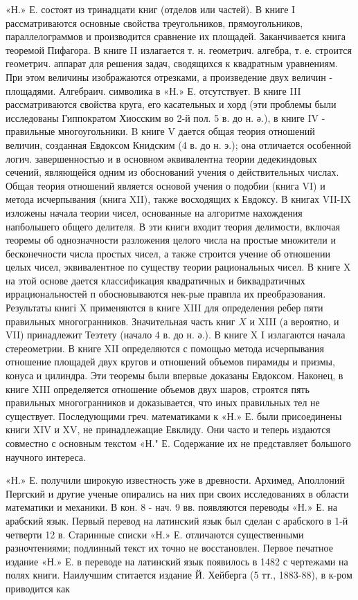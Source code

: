 \documentclass[10pt]{article}
\begin{document}
«Н.» Е. состоят из тринадцати книг (отделов или частей). В книге I рассматриваются основные свойства треугольников, прямоугольников, параллелограммов и производится сравнение их площадей. Заканчивается книга теоремой Пифагора. В книге II излагается т. н. геометрич. алгебра, т. е. строится геометрич. аппарат для решения задач, сводящихся к квадратным уравнениям. При этом величины изображаются отрезками, а произведение двух величин - площадями. Алгебраич. символика в «Н.» Е. отсутствует. В книге III рассматриваются свойства круга, его касательных и хорд (эти проблемы были исследованы Гиппократом Хиосским во 2-й пол. 5 в. до н. ә.), в книге IV - правильные многоугольники. B книге $\mathrm{V}$ дается общая теория отношений величин, созданная Евдоксом Книдским (4 в. до н. э.); она отличается особенной логич. завершенностью и в основном әквивалентна теории дедекиндовых сечений, являющейся одним из обоснований учения о действительных числах. Общая теория отношений является основой учения о подобии (книга VI) и метода исчерпывания (книга XII), также восходящих к Евдоксу. В книгах VII-IX изложены начала теории чисел, основанные на алгоритме нахождения напбольшего общего делителя. В эти книги входит теория делимости, включая теоремы об однозначности разложения целого числа на простые множители и бесконечности числа простых чисел, а также строится учение об отношении целых чисел, эквивалентное по существу теории рациональных чисел. В книге $\mathrm{X}$ на этой основе дается классификация квадратичных и биквадратичных иррациональностей п обосновываются нек-рые правпла их преобразования. Результаты книгі $\mathrm{X}$ применяются в книге XIII для определения ребер пяти правильных многогранников. Значительная часть книг $X$ и XIII (а вероятно, и VII) принадлежит Теэтету (начало 4 в. до н. ә.). В книге X I излагаются начала стереометрии. В книге XII определяются с помощью метода исчерпывания отношение площадей двух кругов и отношений объемов пирамиды и призмы, конуса и цилиндра. Эти теоремы были впервые доказаны Евдоксом. Наконец, в книге XIII определяется отношение объемов двух шаров, строятся пять правильных многогранников и доказывается, что иных правильных тел не существует. Последующими греч. математиками к «Н.» Е. были присоединены книги XIV и XV, не принадлежащие Евклиду. Они часто и теперь издаются совместно с основным текстом «Н." Е. Содержание их не представляет большого научного интереса.



«Н.» Е. получили широкую известность уже в древности. Архимед, Аполлоний Пергский и другие ученые опирались на них при своих исследованиях в области математики и механики. В кон. 8 - нач. 9 вв. появляются переводы «Н.» Е. на арабский язык. Первый перевод на латинский язык был сделан с арабского в 1-й четверти 12 в. Старинные списки «Н.» Е. отличаются существенными разночтениями; подлинный текст их точно не восстановлен. Первое печатное издание «Н.» Е. в переводе на латинский язык появилось в 1482 с чертежами на полях книги. Наилучшим ститается издание Й. Хейберга (5 тт., 1883-88), в к-ром приводится как
\end{document}
